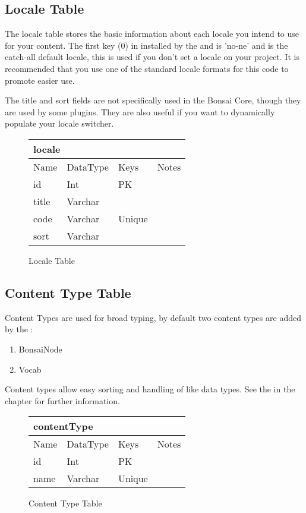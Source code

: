 \documentclass[]{book}
\begin{document}
\subsection{Locale Table}

The locale table stores the basic information about each locale you intend to use for your content. The first key (0) in installed by the  and is 'no-ne' and is the catch-all default locale, this is used if you don't set a locale on your project. It is recommended that you use one of the standard locale formats for this code to promote easier use.

The title and sort fields are not specifically used in the Bonsai Core, though they are used by some plugins. They are also useful if you want to dynamically populate your locale switcher.

\begin{figure}[H]
	\centering
	\caption{Locale Table}
	\vspace{12pt}
	\begin{tabular}{ |p{1.25in}|p{.75in}|p{2in}|p{1in}| }
		\hline
		\multicolumn{4}{|l|}{\textbf{locale}} \\
		\hline
		\hline
		Name & DataType & Keys & Notes\\
		\hline
		id & Int & PK & \\
		title & Varchar & & \\
		code & Varchar & Unique & \\
		sort & Varchar & & \\
		\hline
	\end{tabular}
\end{figure}

\subsection{Content Type Table}

Content Types are used for broad typing, by default two content types are added by the :

\begin{enumerate}
	\item BonsaiNode
	\item Vocab
\end{enumerate}

Content types allow easy sorting and handling of like data types. See the  in the  chapter for further information.

\begin{figure}[H]
	\centering
	\caption{Content Type Table}
	\vspace{12pt}
	\begin{tabular}{ |p{1.25in}|p{.75in}|p{2in}|p{1in}| }
		\hline
		\multicolumn{4}{|l|}{\textbf{contentType}} \\
		\hline
		\hline
		Name & DataType & Keys & Notes\\
		\hline
		id & Int & PK & \\
		name & Varchar & Unique & \\
		\hline
	\end{tabular}
\end{figure}
\end{document}
